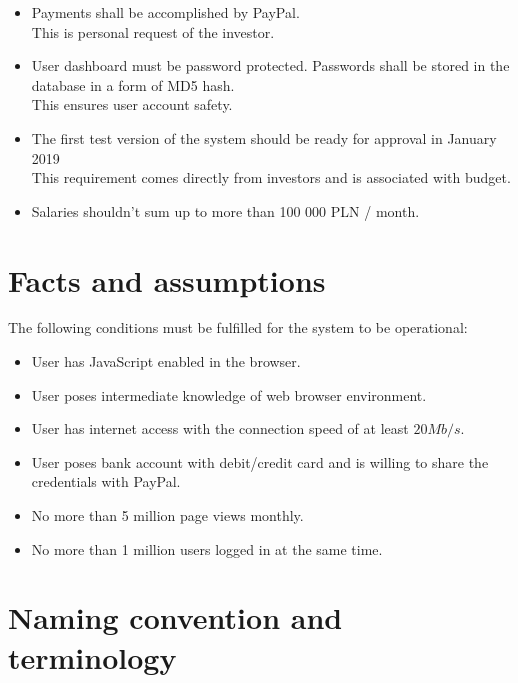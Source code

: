 \documentclass{scrreprt}
\begin{document}
\begin{itemize}
\item Payments shall be accomplished by PayPal.
\\This is personal request of the investor.

\item User dashboard must be password protected. Passwords shall be stored in the database in a form of MD5 hash.
\\This ensures user account safety.

\item The first test version of the system should be ready for approval in January 2019
\\This requirement comes directly from investors and is associated with budget.

\item Salaries shouldn't sum up to more than 100 000 PLN / month.

\end{itemize}

\section{Facts and assumptions}

The following conditions must be fulfilled for the system to be operational:
\begin{itemize}
\item User has JavaScript enabled in the browser.
\item User poses intermediate knowledge of web browser environment.
\item User has internet access with the connection speed of at least $20Mb/s$.
\item User poses bank account with debit/credit card and is willing to share the credentials with PayPal.
\item No more than 5 million page views monthly.
\item No more than 1 million users logged in at the same time.
\end{itemize}

\section{Naming convention and terminology}
\label{comp-skills}
\end{document}
